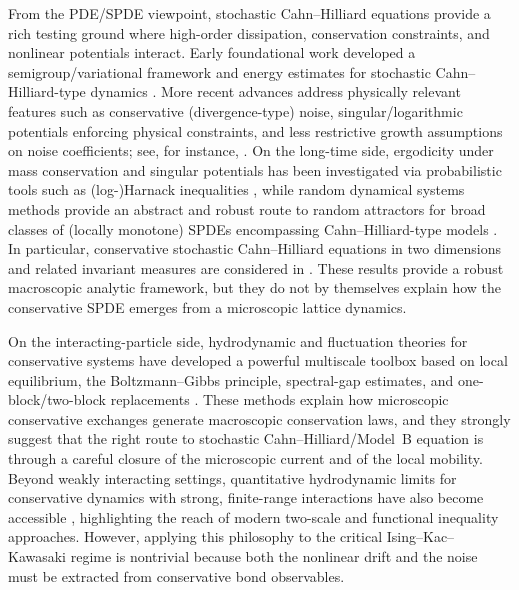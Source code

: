 \documentclass{article}
\begin{document}
From the PDE/SPDE viewpoint, stochastic Cahn--Hilliard equations provide a rich testing ground where high-order dissipation, conservation constraints, and nonlinear potentials interact.
Early foundational work developed a semigroup/variational framework and energy estimates for
stochastic Cahn--Hilliard-type dynamics \cite{DaPratoZabczyk1992,DaPratoDebussche1995}.
More recent advances address physically relevant features such as conservative (divergence-type)
noise, singular/logarithmic potentials enforcing physical constraints, and less restrictive
growth assumptions on noise coefficients; see, for instance,
\cite{CuiHong2023,DG2024,GX2020}.
On the long-time side, ergodicity under mass conservation and singular potentials has been
investigated via probabilistic tools such as (log-)Harnack inequalities \cite{GX2020}, while
random dynamical systems methods provide an abstract and robust route to random attractors for broad classes of (locally monotone) SPDEs encompassing Cahn--Hilliard-type models \cite{GS2020}.
In particular, conservative stochastic Cahn--Hilliard equations
in two dimensions and related invariant measures are considered in
\cite{RocknerYangZhu2021}.
These results provide a robust macroscopic analytic framework, but they do not by themselves
explain how the conservative SPDE emerges from a microscopic lattice dynamics.


On the interacting-particle side, hydrodynamic and fluctuation theories for conservative systems have developed a powerful multiscale toolbox based on local equilibrium, the Boltzmann--Gibbs
principle, spectral-gap estimates, and one-block/two-block replacements
\cite{FunakiHandaUchiyama1991,KipnisLandim1999,Funaki2018HydrodynamicLimitExclusion,Spohn1991}.
These methods explain how microscopic conservative exchanges generate macroscopic conservation laws,
and they strongly suggest that the right route to stochastic Cahn–Hilliard/Model~B equation is through a careful closure of the microscopic current and of the local mobility.
Beyond weakly interacting settings, quantitative hydrodynamic limits for conservative dynamics
with strong, finite-range interactions have also become accessible \cite{KwonMenzNam2023HydrodynamicKawasakiStrong},
highlighting the reach of modern two-scale and functional inequality approaches.
However, applying this philosophy to the critical Ising--Kac--Kawasaki regime is nontrivial
because both the nonlinear drift and the noise must be extracted from conservative bond observables.
\end{document}
